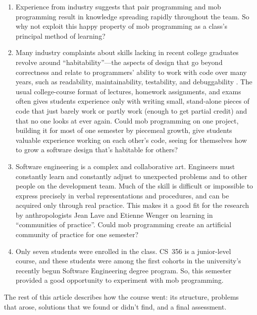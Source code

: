 \documentclass{article}
\begin{document}
\begin{enumerate}
  \item Experience from industry suggests that pair programming and mob
  programming result in knowledge spreading rapidly throughout the team.
  So why not exploit this happy property of mob programming as a class's
  principal method of learning?

  \item Many industry complaints about skills lacking in recent college
  graduates revolve around ``habitability''---the aspects of design that
  go beyond correctness and relate to programmers' ability to work with
  code over many years, such as readability, maintainability, testability,
  and debuggability \cite{Gabriel1996}. The usual college-course format
  of lectures, homework assignments, and exams often gives students
  experience only with writing small, stand-alone pieces of code that just
  barely work or partly work (enough to get partial credit) and that no one
  looks at ever again. Could mob programming on one project, building it for
  most of one semester by piecemeal growth, give students valuable experience
  working on each other's code, seeing for themselves how to grow a 
  software design that's habitable for others?

  \item Software engineering is a complex and collaborative art.
  Engineers must constantly learn and constantly adjust to unexpected problems
  and to other people on the development team. Much of the skill is difficult
  or impossible to express precisely in verbal representations and procedures,
  and can be acquired only through real practice. This makes it a good fit for
  the research by anthropologists Jean Lave and Etienne Wenger on learning in
  ``communities of practice''. \cite{wenger2015introduction} Could mob
  programming create an artificial community of practice for one semester?

  \item Only seven students were enrolled in the class. CS~356 is a
  junior-level course, and these students were among the first cohorts in the
  university's recently begun Software Engineering degree program. So,
  this semester provided a good opportunity to experiment with mob
  programming.
\end{enumerate}

The rest of this article describes how the course went: its structure,
problems that arose, solutions that we found or didn't find, and a final
assessment.
\end{document}
